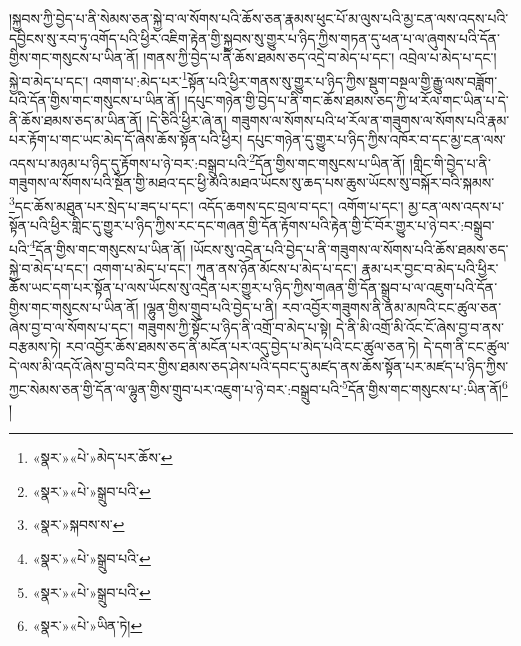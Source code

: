 །སྐྱབས་ཀྱི་བྱེད་པ་ནི་སེམས་ཅན་སྐྱེ་བ་ལ་སོགས་པའི་ཆོས་ཅན་རྣམས་ཕུང་པོ་མ་ལུས་པའི་མྱ་ངན་ལས་འདས་པའི་དབྱིངས་སུ་རབ་ཏུ་འགོད་པའི་ཕྱིར་འཇིག་རྟེན་གྱི་སྐྱབས་སུ་གྱུར་པ་ཉིད་ཀྱིས་གཏན་དུ་ཕན་པ་ལ་ཞུགས་པའི་དོན་གྱིས་གང་གསུངས་པ་ཡིན་ནོ། །གནས་ཀྱི་བྱེད་པ་ནི་ཆོས་ཐམས་ཅད་འདྲེ་བ་མེད་པ་དང་། འབྲེལ་པ་མེད་པ་དང་། སྐྱེ་བ་མེད་པ་དང་། འགག་པ་:མེད་པར་\footnote{«སྣར་»«པེ་»མེད་པར་ཆོས་}སྟོན་པའི་ཕྱིར་གནས་སུ་གྱུར་པ་ཉིད་ཀྱིས་སྡུག་བསྔལ་གྱི་རྒྱུ་ལས་བཟློག་པའི་དོན་གྱིས་གང་གསུངས་པ་ཡིན་ནོ། །དཔུང་གཉེན་གྱི་བྱེད་པ་ནི་གང་ཆོས་ཐམས་ཅད་ཀྱི་ཕ་རོལ་གང་ཡིན་པ་དེ་ནི་ཆོས་ཐམས་ཅད་མ་ཡིན་ནོ། །དེ་ཅིའི་ཕྱིར་ཞེ་ན། གཟུགས་ལ་སོགས་པའི་ཕ་རོལ་ན་གཟུགས་ལ་སོགས་པའི་རྣམ་པར་རྟོག་པ་གང་ཡང་མེད་དོ་ཞེས་ཆོས་སྟོན་པའི་ཕྱིར། དཔུང་གཉེན་དུ་གྱུར་པ་ཉིད་ཀྱིས་འཁོར་བ་དང་མྱ་ངན་ལས་འདས་པ་མཉམ་པ་ཉིད་དུ་རྟོགས་པ་ཉེ་བར་:བསྒྲུབ་པའི་\footnote{«སྣར་»«པེ་»སྒྲུབ་པའི་}དོན་གྱིས་གང་གསུངས་པ་ཡིན་ནོ། །གླིང་གི་བྱེད་པ་ནི་གཟུགས་ལ་སོགས་པའི་སྔོན་གྱི་མཐའ་དང་ཕྱི་མའི་མཐའ་ཡོངས་སུ་ཆད་པས་ཆུས་ཡོངས་སུ་བསྐོར་བའི་སྐམས་\footnote{«སྣར་»སྐབས་ས་}དང་ཆོས་མཐུན་པར་སྲེད་པ་ཟད་པ་དང་། འདོད་ཆགས་དང་བྲལ་བ་དང་། འགོག་པ་དང་། མྱ་ངན་ལས་འདས་པ་སྟོན་པའི་ཕྱིར་གླིང་དུ་གྱུར་པ་ཉིད་ཀྱིས་རང་དང་གཞན་གྱི་དོན་རྟོགས་པའི་རྟེན་གྱི་ངོ་བོར་གྱུར་པ་ཉེ་བར་:བསྒྲུབ་པའི་\footnote{«སྣར་»«པེ་»སྒྲུབ་པའི་}དོན་གྱིས་གང་གསུངས་པ་ཡིན་ནོ། །ཡོངས་སུ་འདྲེན་པའི་བྱེད་པ་ནི་གཟུགས་ལ་སོགས་པའི་ཆོས་ཐམས་ཅད་སྐྱེ་བ་མེད་པ་དང་། འགག་པ་མེད་པ་དང་། ཀུན་ནས་ཉོན་མོངས་པ་མེད་པ་དང་། རྣམ་པར་བྱང་བ་མེད་པའི་ཕྱིར་ཆོས་ཡང་དག་པར་སྟོན་པ་ལས་ཡོངས་སུ་འདྲེན་པར་གྱུར་པ་ཉིད་ཀྱིས་གཞན་གྱི་དོན་སྒྲུབ་པ་ལ་འཇུག་པའི་དོན་གྱིས་གང་གསུངས་པ་ཡིན་ནོ། །ལྷུན་གྱིས་གྲུབ་པའི་བྱེད་པ་ནི། རབ་འབྱོར་གཟུགས་ནི་ནམ་མཁའི་ངང་ཚུལ་ཅན་ཞེས་བྱ་བ་ལ་སོགས་པ་དང་། གཟུགས་ཀྱི་སྟོང་པ་ཉིད་ནི་འགྲོ་བ་མེད་པ་སྟེ། དེ་ནི་མི་འགྲོ་མི་འོང་ངོ་ཞེས་བྱ་བ་ནས་བརྩམས་ཏེ། རབ་འབྱོར་ཆོས་ཐམས་ཅད་ནི་མངོན་པར་འདུ་བྱེད་པ་མེད་པའི་ངང་ཚུལ་ཅན་ཏེ། དེ་དག་ནི་ངང་ཚུལ་དེ་ལས་མི་འདའོ་ཞེས་བྱ་བའི་བར་གྱིས་ཐམས་ཅད་ཤེས་པའི་དབང་དུ་མཛད་ནས་ཆོས་སྟོན་པར་མཛད་པ་ཉིད་ཀྱིས་ཀྱང་སེམས་ཅན་གྱི་དོན་ལ་ལྷུན་གྱིས་གྲུབ་པར་འཇུག་པ་ཉེ་བར་:བསྒྲུབ་པའི་\footnote{«སྣར་»«པེ་»སྒྲུབ་པའི་}དོན་གྱིས་གང་གསུངས་པ་:ཡིན་ནོ།\footnote{«སྣར་»«པེ་»ཡིན་ཏེ།} །
